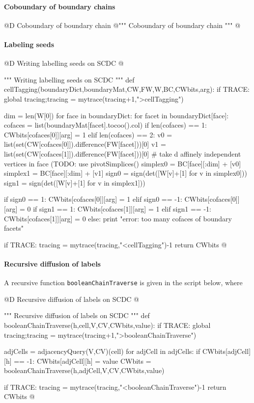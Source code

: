\documentclass[11pt,oneside]{article}	%
\begin{document}
\paragraph{Coboundary of boundary chains}

@D Coboundary of boundary chain
@{""" Coboundary of boundary chain """
@}


\paragraph{Labeling seeds}

@D Writing labelling seeds on SCDC
@{""" Writing labelling seeds on SCDC """
def cellTagging(boundaryDict,boundaryMat,CW,FW,W,BC,CWbits,arg):
	if TRACE: global tracing;tracing = mytrace(tracing+1,">cellTagging")

	dim = len(W[0])
	for face in boundaryDict:
		for facet in boundaryDict[face]:
			cofaces = list(boundaryMat[facet].tocoo().col)
			if len(cofaces) == 1: 
				CWbits[cofaces[0]][arg] = 1
			elif len(cofaces) == 2:
				v0 = list(set(CW[cofaces[0]]).difference(FW[facet]))[0]
				v1 = list(set(CW[cofaces[1]]).difference(FW[facet]))[0]
				# take d affinely independent vertices in face (TODO: use pivotSimplices() 
				simplex0 = BC[face][:dim] + [v0]
				simplex1 = BC[face][:dim] + [v1]
				sign0 = sign(det([W[v]+[1] for v in simplex0]))
				sign1 = sign(det([W[v]+[1] for v in simplex1]))
				
				if sign0 == 1: CWbits[cofaces[0]][arg] = 1
				elif sign0 == -1: CWbits[cofaces[0]][arg] = 0
				if sign1 == 1: CWbits[cofaces[1]][arg] = 1
				elif sign1 == -1: CWbits[cofaces[1]][arg] = 0
			else: 
				print "error: too many cofaces of boundary facets"

	if TRACE: tracing = mytrace(tracing,"<cellTagging")-1
	return CWbits
@}


\paragraph{Recursive diffusion of labels}
A recursive function \texttt{booleanChainTraverse} is given in the script below, where 

@D Recursive diffusion of labels on SCDC
@{""" Recursive diffusion of labels on SCDC """
def booleanChainTraverse(h,cell,V,CV,CWbits,value):
	if TRACE: global tracing;tracing = mytrace(tracing+1,">booleanChainTraverse")

	adjCells = adjacencyQuery(V,CV)(cell)
	for adjCell in adjCells: 
		if CWbits[adjCell][h] == -1:
			CWbits[adjCell][h] = value
			CWbits = booleanChainTraverse(h,adjCell,V,CV,CWbits,value)

	if TRACE: tracing = mytrace(tracing,"<booleanChainTraverse")-1
	return CWbits
@}
\end{document}
